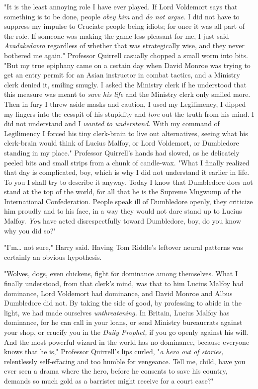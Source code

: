"It is the least annoying role I have ever played. If Lord Voldemort says that 
something is to be done, people \emph{obey him} and \emph{do not argue.} I did 
not have to suppress my impulse to Cruciate people being idiots; for once it 
was all part of the role. If someone was making the game less pleasant for me, 
I just said \emph{Avadakedavra} regardless of whether that was strategically 
wise, and they never bothered me again." Professor Quirrell casually chopped a 
small worm into bits. "But my true epiphany came on a certain day when David 
Monroe was trying to get an entry permit for an Asian instructor in combat 
tactics, and a Ministry clerk denied it, smiling smugly. I asked the Ministry 
clerk if he understood that this measure was meant to \emph{save his life} and 
the Ministry clerk only smiled more. Then in fury I threw aside masks and 
caution, I used my Legilimency, I dipped my fingers into the cesspit of his 
stupidity and \emph{tore} out the truth from his mind. I did not understand and 
I \emph{wanted to understand.} With my command of Legilimency I forced his tiny 
clerk-brain to live out alternatives, seeing what his clerk-brain would think 
of Lucius Malfoy, or Lord Voldemort, or Dumbledore standing in my place." 
Professor Quirrell's hands had slowed, as he delicately peeled bits and small 
strips from a chunk of candle-wax. "What I finally realized that day is 
complicated, boy, which is why I did not understand it earlier in life. To you 
I shall try to describe it anyway. Today I know that Dumbledore does not stand 
at the top of the world, for all that he is the Supreme Mugwump of the 
International Confederation. People speak ill of Dumbledore openly, they 
criticize him proudly and to his face, in a way they would not dare stand up to 
Lucius Malfoy. \emph{You} have acted disrespectfully toward Dumbledore, boy, do 
you know why you did so?"

"I'm{\ldots} not sure," Harry said. Having Tom Riddle's leftover neural 
patterns was certainly an obvious hypothesis.

"Wolves, dogs, even chickens, fight for dominance among themselves. What I 
finally understood, from that clerk's mind, was that to him Lucius Malfoy had 
dominance, Lord Voldemort had dominance, and David Monroe and Albus Dumbledore 
did not. By taking the side of good, by professing to abide in the light, we 
had made ourselves \emph{unthreatening.} In Britain, Lucius Malfoy has 
dominance, for he can call in your loans, or send Ministry bureaucrats against 
your shop, or crucify you in the \emph{Daily Prophet,} if you go openly against 
his will. And the most powerful wizard in the world has no dominance, because 
everyone knows that he is," Professor Quirrell's lips curled, "\emph{a hero out 
of stories,} relentlessly self-effacing and too humble for vengeance. Tell me, 
child, have you ever seen a drama where the hero, before he consents to save 
his country, demands so much gold as a barrister might receive for a court 
case?"

